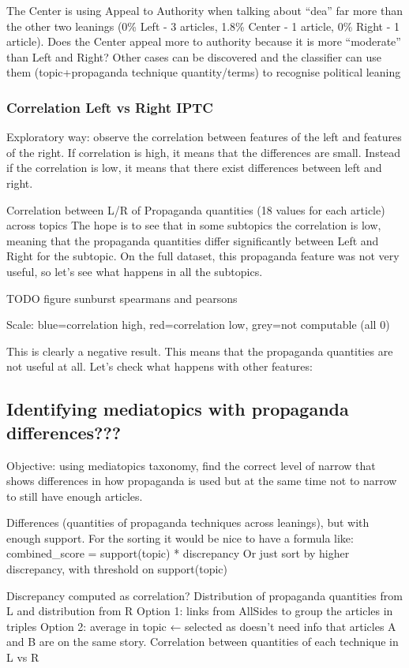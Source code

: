 The Center is using Appeal to Authority when talking about “dea” far more than the other two leanings (0\% Left - 3 articles, 1.8\% Center - 1 article, 0\% Right - 1 article). Does the Center appeal more to authority because it is more “moderate” than Left and Right?
Other cases can be discovered and the classifier can use them (topic+propaganda technique quantity/terms) to recognise political leaning

\subsubsection{Correlation Left vs Right IPTC}
Exploratory way: observe the correlation between features of the left and features of the right. If correlation is high, it means that the differences are small. Instead if the correlation is low, it means that there exist differences between left and right.


Correlation between L/R of Propaganda quantities (18 values for each article) across topics
The hope is to see that in some subtopics the correlation is low, meaning that the propaganda quantities differ significantly between Left and Right for the subtopic.
On the full dataset, this propaganda feature was not very useful, so let’s see what happens in all the subtopics.

TODO figure sunburst spearmans and pearsons

Scale: blue=correlation high, red=correlation low, grey=not computable (all 0)

This is clearly a negative result. This means that the propaganda quantities are not useful at all. Let’s check what happens with other features:


\subsection{Identifying mediatopics with propaganda differences???}

Objective: using mediatopics taxonomy, find the correct level of narrow that shows differences in how propaganda is used but at the same time not to narrow to still have enough articles.

Differences (quantities of propaganda techniques across leanings), but with enough support. For the sorting it would be nice to have a formula like: 
combined\_score = support(topic) * discrepancy
Or just sort by higher discrepancy, with threshold on support(topic)

Discrepancy computed as correlation?
Distribution of propaganda quantities from L and distribution from R
Option 1: links from AllSides to group the articles in triples
Option 2: average in topic ← selected as doesn’t need info that articles A and B are on the same story. Correlation between quantities of each technique in L vs R

